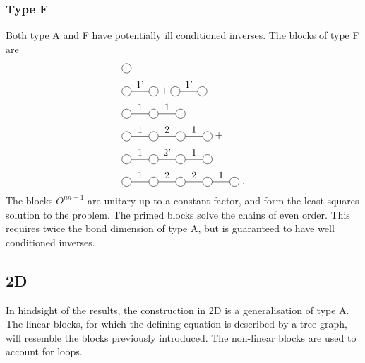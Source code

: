 \documentclass[twocolumn]{article}
\newcounter{a}
\newcounter{b}
\begin{document}
\subsubsection{Type F}
Both type A and F have potentially ill conditioned inverses. The blocks of type F are
\begin{subequations}
    \begin{align}
         & \mpob{1}{ {,}  }{}{}{}{{,,}}                                          \\
         & \mpob{2}{ {,"1'",}  }{}{}{}{{,,}}+  \mpob{2}{ {,"1'",}  }{}{}{}{{,,}} \\
         & \mpob{3}{ {,"1","1",}  }{}{}{}{{,,,}}                                 \\
         & \mpob{4}{ {,"1","2","1",}  }{}{}{}{{,,,,,}} \; +  \nonumber           \\
         & \mpob{4}{ {,"1","2'","1",}  }{}{}{}{{,,,,,}}                          \\
         & \mpob{5}{ {,"1","2","2","1",}  }{}{}{}{{,,,,,}} \;.
    \end{align}
\end{subequations}
The blocks $O^{n n+1}$ are unitary up to a constant factor, and form the least squares solution to the problem. The primed blocks solve the chains of even order. This requires twice the bond dimension of type A, but is guaranteed to have well conditioned inverses.

\subsection{2D}
In hindsight of the results, the construction in 2D is a generalisation of type A. The linear blocks, for which the defining equation is described by a tree graph, will resemble the blocks previously introduced. The non-linear blocks are used to account for loops.
\end{document}
